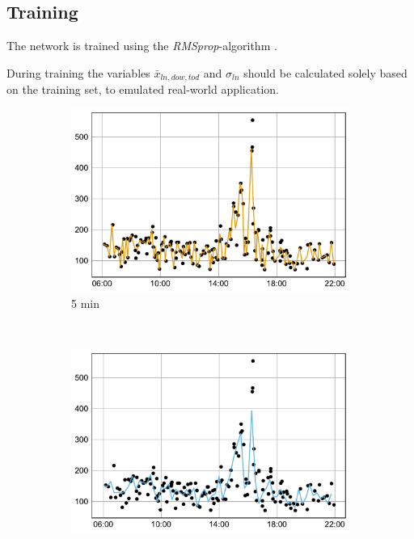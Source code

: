 \documentclass[preprint,11pt,5p,twocolumn]{elsarticle}
\begin{document}
\subsection{Training}
The network is trained using the \emph{RMSprop}-algorithm \cite{RMSprop}.

During training the variables $\mathit{\bar{x}_{\mathit{ln},\mathit{dow},\mathit{tod}}}$ and $\sigma_\mathit{ln}$ should be calculated solely based on the training set, to emulated real-world application.

\begin{figure}[!t]
    \centering
    \begin{subfigure}[t]{0.31\textwidth}
        \centering
        \includegraphics[width=\textwidth]{plots/decycle_5min_n.pdf}
        \caption{5 min}
    \end{subfigure}%
    ~ 
    \begin{subfigure}[t]{0.31\textwidth}
        \centering
        \includegraphics[width=\textwidth]{plots/decycle_15min_n.pdf}

\end{subfigure}
\end{figure}
\end{document}
